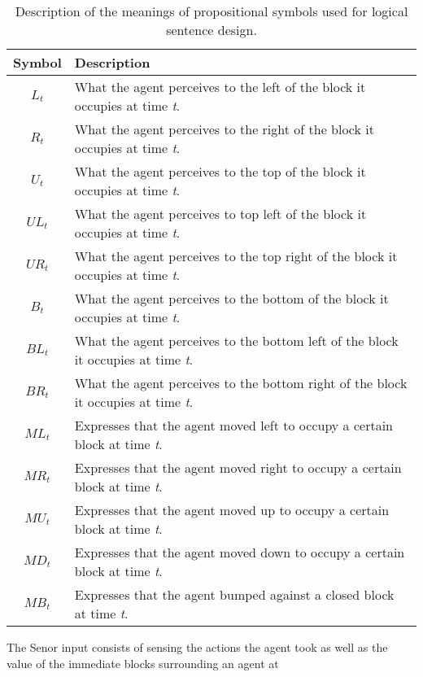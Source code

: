 \begin{table}[H]
  \begin{center}
    \label{tab:table1}
    \begin{tabular}{c|l}
      \textbf{Symbol} & \textbf{Description} \\ 
      \hline
      $L_t$ & What the agent perceives to the left of the block it occupies at time \textit{t}. \\ 
      $R_t$ & What the agent perceives to the right of the block it occupies at time \textit{t}. \\  
      $U_t$ & What the agent perceives to the top of the block it occupies at time \textit{t}. \\ 
      ${UL}_t$ & What the agent perceives to top left of the block it occupies at time \textit{t}. \\ 
      ${UR}_t$ & What the agent perceives to the top right of the block it occupies at time \textit{t}. \\
      $B_t$ & What the agent perceives to the bottom of the block it occupies at time \textit{t}. \\
      ${BL}_t$ & What the agent perceives to the bottom left of the block it occupies at time \textit{t}. \\ 
      ${BR}_t$ & What the agent perceives to the bottom right of the block it occupies at time \textit{t}. \\  
      ${ML}_t$ & Expresses that the agent moved left to occupy a certain block at time \textit{t}.\\ 
      ${MR}_t$ & Expresses that the agent moved right to occupy a certain block at time \textit{t}.\\ 
      ${MU}_t$ & Expresses that the agent moved up to occupy a certain block at time \textit{t}.\\  
      ${MD}_t$ & Expresses that the agent moved down to occupy a certain block at time \textit{t}.\\  
      ${MB}_t$ & Expresses that the agent bumped against a closed block at time \textit{t}.\\ 
    \end{tabular}
  \end{center}
  \caption{Description of the meanings of propositional symbols used for logical sentence design.}
\end{table}


\label{subsubsec: sensor}

The Senor input consists of sensing the actions the agent took as well as the value of the immediate blocks surrounding an agent at 

